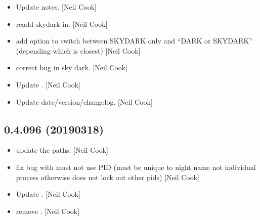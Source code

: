 \documentclass[a4paper,10pt,english]{report}
\begin{document}
\begin{itemize}
\begin{description}
\end{description}

\item {} 
Update notes. {[}Neil Cook{]}

\item {} 
 \sphinxhyphen{} re\sphinxhyphen{}add skydark in. {[}Neil Cook{]}

\item {} 
 \sphinxhyphen{} add option to switch between SKYDARK only
and “DARK or SKYDARK” (depending which is closest) {[}Neil Cook{]}

\item {} 
 \sphinxhyphen{} correct bug in sky dark. {[}Neil Cook{]}

\item {} 
Update . {[}Neil Cook{]}

\item {} 
Update date/version/changelog. {[}Neil Cook{]}

\end{itemize}


\subsection{0.4.096 (2019\sphinxhyphen{}03\sphinxhyphen{}18)}
\label{\detokenize{misc/changelog:id183}}\begin{itemize}
\item {} 
 \sphinxhyphen{} update the paths. {[}Neil Cook{]}

\item {} 
 \sphinxhyphen{} fix bug with  \sphinxhyphen{} must not use PID
(must be unique to night name not individual process otherwise does
not lock out other pids) {[}Neil Cook{]}

\item {} 
Update . {[}Neil Cook{]}

\item {} 
 \sphinxhyphen{} remove . {[}Neil Cook{]}

\end{itemize}
\end{document}
